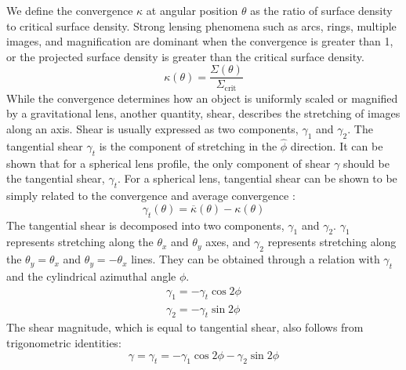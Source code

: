 \documentclass[10pt]{article}
\begin{document}
We define the convergence $\kappa$ at angular position $\theta$ as the ratio of surface density to critical surface density. Strong lensing phenomena such as arcs, rings, multiple images, and magnification are dominant when the convergence is greater than 1, or the projected surface density is greater than the critical surface density.
\begin{equation} \label{convergence}
\kappa(\theta) = \frac{\Sigma(\theta)}{\Sigma_\mathrm{crit}}
\end{equation}
While the convergence determines how an object is uniformly scaled or magnified by a gravitational lens, another quantity, shear, describes the stretching of images along an axis. Shear is usually expressed as two components, $\gamma_1$ and $\gamma_2$. The tangential shear $\gamma_t$ is the component of stretching in the $\hat{\phi}$ direction. It can be shown that for a spherical lens profile, the only component of shear $\gamma$ should be the tangential shear, $\gamma_t$. For a spherical lens, tangential shear can be shown to be simply related to the convergence and average convergence \citep{Dodelson2017}:
\begin{equation} \label{tangentialshear}
\gamma_t(\theta) = \overline{\kappa}(\theta) - \kappa(\theta)
\end{equation}
The tangential shear is decomposed into two components, $\gamma_1$ and $\gamma_2$. $\gamma_1$ represents stretching along the $\theta_x$ and $\theta_y$ axes, and $\gamma_2$ represents stretching along the $\theta_y = \theta_x$ and $\theta_y = - \theta_x$ lines. They can be obtained through a relation with $\gamma_t$ and the cylindrical azimuthal angle $\phi$.
\begin{equation}
\begin{split}
\gamma_1 = -\gamma_t \cos{2\phi}\\
\gamma_2 = -\gamma_t \sin{2\phi}
\end{split}
\end{equation}
The shear magnitude, which is equal to tangential shear, also follows from trigonometric identities:
\begin{equation}
\gamma = \gamma_t = -\gamma_1 \cos{2\phi} -\gamma_2 \sin{2\phi}
\end{equation}
\end{document}
